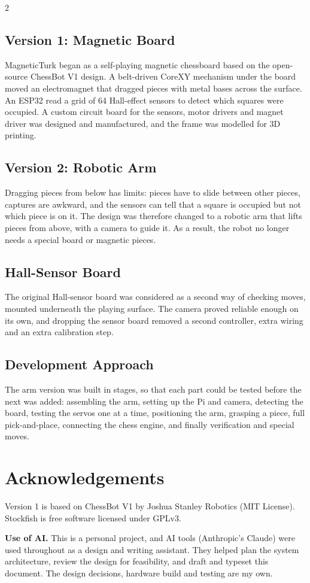 \documentclass[10pt,a4paper]{article}
\newcommand{\product}{MagneticTurk}
\begin{document}
\begin{multicols}{2}
\subsection{Version 1: Magnetic Board}
\product{} began as a self-playing magnetic chessboard based on the open-source
ChessBot V1 design. A belt-driven CoreXY mechanism under the board moved an
electromagnet that dragged pieces with metal bases across the surface. An ESP32 read a grid of
64 Hall-effect sensors to detect which squares were occupied. A custom circuit board for the sensors,
motor drivers and magnet driver was designed and manufactured, and the frame was modelled for 3D printing.

\subsection{Version 2: Robotic Arm}
Dragging pieces from below has limits: pieces have to slide between other pieces, captures
are awkward, and the sensors can tell that a square is occupied but not which piece is on it.
The design was therefore changed to a robotic arm that lifts pieces from above, with a camera to guide
it. As a result, the robot no longer needs a special board or magnetic pieces.

\subsection{Hall-Sensor Board}
The original Hall-sensor board was considered as a second way of checking moves, mounted
underneath the playing surface. The camera proved reliable enough on its own, and dropping
the sensor board removed a second controller, extra wiring and an extra calibration step.

\subsection{Development Approach}
The arm version was built in stages, so that each part could be tested before the next was
added: assembling the arm, setting up the Pi and camera, detecting the board, testing the servos
one at a time, positioning the arm, grasping a piece, full pick-and-place, connecting the chess
engine, and finally verification and special moves.

\section{Acknowledgements}
Version 1 is based on ChessBot V1 by Joshua Stanley Robotics (MIT License). Stockfish is
free software licensed under GPLv3.

\textbf{Use of AI.} This is a personal project, and AI tools (Anthropic's Claude) were used
throughout as a design and writing assistant. They helped plan the system architecture,
review the design for feasibility, and draft and typeset this document. The design decisions,
hardware build and testing are my own.

\end{multicols}
\end{document}
